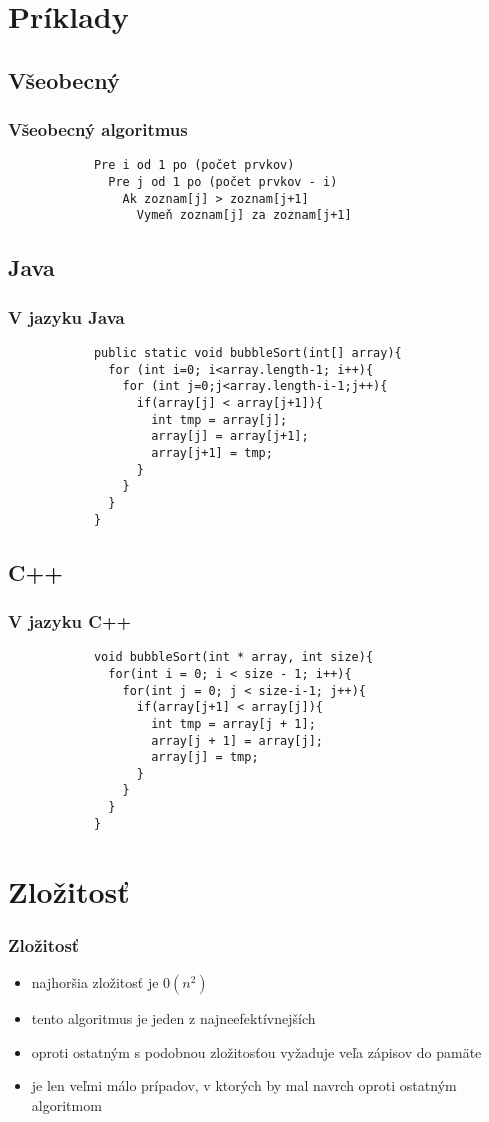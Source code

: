 \documentclass{beamer}
\begin{document}
	\section{Príklady}
	\subsection{Všeobecný}	
	\begin{frame}[fragile]
		\frametitle{Všeobecný algoritmus}
		\begin{verbatim}
			Pre i od 1 po (počet prvkov)
			  Pre j od 1 po (počet prvkov - i)
			    Ak zoznam[j] > zoznam[j+1]
			      Vymeň zoznam[j] za zoznam[j+1]
		\end{verbatim}
	\end{frame}

	\subsection{Java}
	\begin{frame}[fragile]
		\frametitle{V jazyku Java}
		\begin{verbatim}
			public static void bubbleSort(int[] array){
			  for (int i=0; i<array.length-1; i++){
			    for (int j=0;j<array.length-i-1;j++){
			      if(array[j] < array[j+1]){
			        int tmp = array[j];
			        array[j] = array[j+1];
			        array[j+1] = tmp;
			      }
			    }
			  }
			}   
		\end{verbatim}
	\end{frame}

	\subsection{C++}
	\begin{frame}[fragile]
		\frametitle{V jazyku C++}
		\begin{verbatim}
			void bubbleSort(int * array, int size){
			  for(int i = 0; i < size - 1; i++){
			    for(int j = 0; j < size-i-1; j++){
			      if(array[j+1] < array[j]){
			        int tmp = array[j + 1];
			        array[j + 1] = array[j];
			        array[j] = tmp;
			      }
			    }
			  }   
			}
		\end{verbatim}
	\end{frame}

	\section{Zložitosť}
	\begin{frame}
		\frametitle{Zložitosť}
		\begin{itemize}
			\item najhoršia zložitosť je $0(n^2)$
			\item tento algoritmus je jeden z najneefektívnejších
			\item oproti ostatným s podobnou zložitosťou vyžaduje veľa zápisov do pamäte
			\item je len veľmi málo prípadov, v ktorých by mal navrch oproti ostatným algoritmom
		\end{itemize}
	\end{frame}
	
\end{document}
